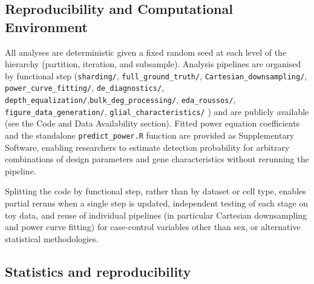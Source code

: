 \documentclass[
]{article}
\begin{document}
\subsection{Reproducibility and Computational
Environment}\label{reproducibility-and-computational-environment}

All analyses are deterministic given a fixed random seed at each level
of the hierarchy (partition, iteration, and subsample). Analysis
pipelines are organised by functional step (\texttt{sharding/},
\texttt{full\_ground\_truth/}, \texttt{Cartesian\_downsampling/},
\texttt{power\_curve\_fitting/}, \texttt{de\_diagnostics/},
\texttt{depth\_equalization/},\texttt{bulk\_deg\_processing/},
\texttt{eda\_roussos/}, \texttt{figure\_data\_generation/},
\texttt{glial\_characteristics/} ) and are publicly available (see the
Code and Data Availability section). Fitted power equation coefficients
and the standalone \texttt{predict\_power.R} function are provided as
Supplementary Software, enabling researchers to estimate detection
probability for arbitrary combinations of design parameters and gene
characteristics without rerunning the pipeline.

Splitting the code by functional step, rather than by dataset or cell
type, enables partial reruns when a single step is updated, independent
testing of each stage on toy data, and reuse of individual pipelines (in
particular Cartesian downsampling and power curve fitting) for
case-control variables other than sex, or alternative statistical
methodologies.

\subsection{Statistics and
reproducibility}\label{statistics-and-reproducibility}
\end{document}
